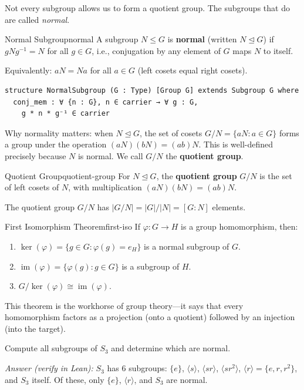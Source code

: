 \documentclass[11pt, a4paper, oneside]{book}
\newcommand{\im}{\operatorname{im}}
\renewcommand{\ker}{\operatorname{ker}}
\newcommand{\normal}{\trianglelefteq}
\newcommand{\iso}{\cong}
\newcounter{exercise}[chapter]
\begin{document}
Not every subgroup allows us to form a quotient group. The subgroups that do
are called \emph{normal}.

\begin{defn}{Normal Subgroup}{normal}
A subgroup $N \leq G$ is \textbf{normal} (written $N \normal G$) if
$gNg^{-1} = N$ for all $g \in G$, i.e., conjugation by any element of $G$
maps $N$ to itself.

Equivalently: $aN = Na$ for all $a \in G$ (left cosets equal right cosets).
\end{defn}

\begin{leanbox}
\begin{verbatim}
structure NormalSubgroup (G : Type) [Group G] extends Subgroup G where
  conj_mem : ∀ {n : G}, n ∈ carrier → ∀ g : G,
    g * n * g⁻¹ ∈ carrier
\end{verbatim}
\end{leanbox}

Why normality matters: when $N \normal G$, the set of cosets $G/N = \{aN : a \in G\}$
forms a group under the operation $(aN)(bN) = (ab)N$. This is well-defined
precisely because $N$ is normal. We call $G/N$ the \textbf{quotient group}.

\begin{defn}{Quotient Group}{quotient-group}
For $N \normal G$, the \textbf{quotient group} $G/N$ is the set of left
cosets of $N$, with multiplication $(aN)(bN) = (ab)N$.
\end{defn}

The quotient group $G/N$ has $|G/N| = |G|/|N| = [G:N]$ elements.

\begin{thm}{First Isomorphism Theorem}{first-iso}
If $\varphi : G \to H$ is a group homomorphism, then:
\begin{enumerate}[nosep, label=(\roman*)]
\item $\ker(\varphi) = \{g \in G : \varphi(g) = e_H\}$ is a normal subgroup of $G$.
\item $\im(\varphi) = \{\varphi(g) : g \in G\}$ is a subgroup of $H$.
\item $G / \ker(\varphi) \iso \im(\varphi)$.
\end{enumerate}
\end{thm}

This theorem is the workhorse of group theory---it says that every
homomorphism factors as a projection (onto a quotient) followed by an
injection (into the target).

\begin{exercisebox}[title={Exercise 2.1}]
Compute all subgroups of $S_3$ and determine which are normal.

\emph{Answer (verify in Lean):} $S_3$ has 6 subgroups: $\{e\}$,
$\langle s \rangle$, $\langle sr \rangle$, $\langle sr^2 \rangle$,
$\langle r \rangle = \{e, r, r^2\}$, and $S_3$ itself.
Of these, only $\{e\}$, $\langle r \rangle$, and $S_3$ are normal.
\end{exercisebox}
\end{document}
